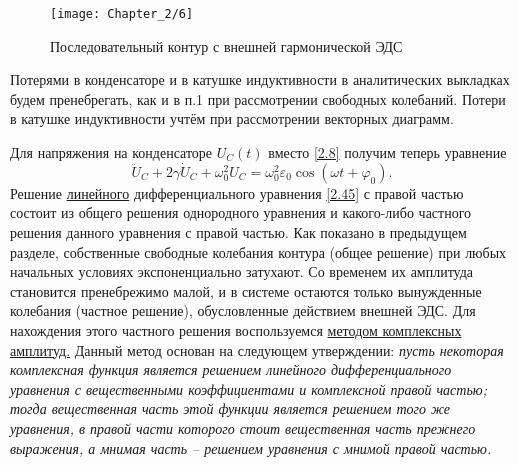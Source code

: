 \begin{figure}[h!]
	\centering
	\texttt{[image: Chapter\_2/6]}
	\caption{Последовательный контур с внешней гармонической ЭДС}
	\label{fig4}
\end{figure}

Потерями в конденсаторе и в катушке индуктивности в аналитических выкладках будем пренебрегать, как и в п.1 при рассмотрении свободных колебаний. Потери в катушке индуктивности учтём при рассмотрении векторных диаграмм.


Для напряжения на конденсаторе $U_C(t)$ вместо \eqref{2.8} получим теперь уравнение
\begin{equation}\label{2.45}
\ddot{U}_C+2\gamma \dot{U}_C+\omega_0^2U_C=\omega_0^2\varepsilon_0\cos(\omega t+ \varphi_0).
\end{equation}
Решение \underline{линейного} дифференциального уравнения \eqref{2.45} с правой частью состоит из общего решения однородного уравнения и какого-либо частного решения данного уравнения с правой частью. Как показано в предыдущем разделе, собственные свободные колебания контура (об\-щее решение) при любых начальных условиях экспоненциально затухают. Со временем их ам\-плитуда становится пренебрежимо малой, и в системе остаются только вынужденные ко\-ле\-ба\-ния (частное решение), обусловленные действием внешней ЭДС. Для нахождения этого частного решения воспользуемся \underline{методом комплексных амплитуд.} Данный метод основан на следующем ут\-вер\-жде\-нии: \emph{пусть некоторая комплексная функция является решением линейного дифференциального уравнения с вещественными коэффициентами и комплексной правой ча\-стью; тогда вещественная часть этой функции является решением того же уравнения, в пра\-вой части которого стоит вещественная часть прежнего выражения, а мнимая часть – ре\-шением уравнения с мнимой правой частью.}

